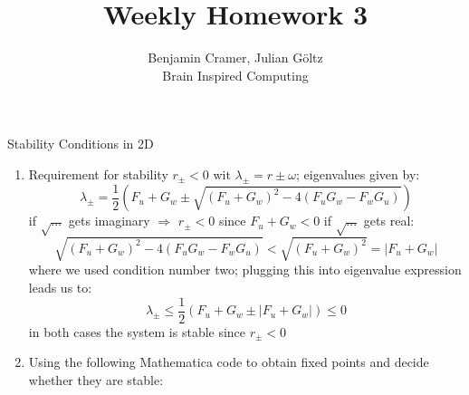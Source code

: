 \documentclass[12pt]{article}
\newenvironment{exercise}[2][Exercise]{\begin{trivlist}
\item[\hskip \labelsep {\bfseries #1}\hskip \labelsep {\bfseries #2.}]}{\end{trivlist}}
\begin{document}
 
 
\title{Weekly Homework 3}
\author{Benjamin Cramer, Julian G\"oltz\\
Brain Inspired Computing}
 
\maketitle
 
\begin{exercise}{3.1}
Stability Conditions in 2D \\
\renewcommand{\labelenumi}{\alph{enumi})}
\begin{enumerate}
\item Requirement for stability $r_\pm < 0$ wit $\lambda_\pm = r \pm \omega$; eigenvalues given by:
	\begin{equation}
		\lambda_\pm = \frac{1}{2}\left( F_u + G_w \pm \sqrt{(F_u + G_w)^2 - 4(F_uG_w - F_w G_u)}\right)
	\end{equation}
	if $\sqrt{...}$ gets imaginary $\Rightarrow$ $r_\pm <0$ since $F_u+G_w < 0$
	if $\sqrt{...}$ gets real:
	\begin{equation}
		\sqrt{(F_u + G_w)^2 - 4(F_uG_w - F_w G_u)} < \sqrt{(F_u + G_w)^2} = |F_u + G_w|
	\end{equation}
	where we used condition number two; plugging this into eigenvalue expression leads us to:
	\begin{equation}
		\lambda_\pm \leq \frac{1}{2}(F_u + G_w \pm |F_u + G_w|) \leq 0
	\end{equation}
	in both cases the system is stable since $r_\pm < 0$
\item Using the following Mathematica code to obtain fixed points and decide whether they are stable:


\end{enumerate}
\end{exercise}
\end{document}

